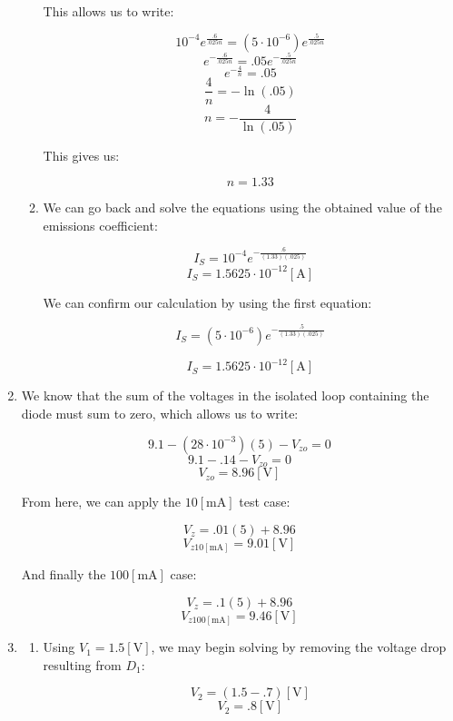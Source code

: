 \begin{enumerate}
\begin{enumerate}
        This allows us to write:

        $$10^{-4}e^{\frac{.6}{.025n}}=(5\cdot10^{-6})e^{\frac{.5}{.025n}}$$
        $$e^{-\frac{.6}{.025n}}=.05e^{-\frac{.5}{.025n}}$$
        $$e^{-\frac{4}{n}}=.05$$
        $$\frac{4}{n}=-\ln(.05)$$
        $$n=-\frac{4}{\ln(.05)}$$

        This gives us:

        $$\boxed{n=1.33}$$

      \item 

        We can go back and solve the equations using the obtained value of the emissions coefficient:

        $$I_S=10^{-4}e^{-\frac{.6}{(1.33)(.025)}}$$
        $$\boxed{I_S=1.5625\cdot10^{-12}[\si{\ampere}]}$$

        We can confirm our calculation by using the first equation:

        $$I_S=(5\cdot10^{-6})e^{-\frac{.5}{(1.33)(.025)}}$$

        $$\boxed{I_S=1.5625\cdot10^{-12}[\si{\ampere}]}$$

    \end{enumerate}

  \item

    We know that the sum of the voltages in the isolated loop containing the diode must sum to zero, which allows us to write:

    $$9.1-(28\cdot10^{-3})(5)-V_{zo}=0$$
    $$9.1-.14-V_{zo}=0$$
    $$\boxed{V_{zo}=8.96[\si{\volt}]}$$

    From here, we can apply the $10[\si{\milli\ampere}]$ test case:

    $$V_z=.01(5)+8.96$$
    $$\boxed{V_{z10[\si{\milli\ampere}]}=9.01[\si{\volt}]}$$

    And finally the $100[\si{\milli\ampere}]$ case:

    $$V_z=.1(5)+8.96$$
    $$\boxed{V_{z100[\si{\milli\ampere}]}=9.46[\si{\volt}]}$$

  \item

    \begin{enumerate}

      \item 

        Using $V_1=1.5[\si{\volt}]$, we may begin solving by removing the voltage drop resulting from $D_1$:

        $$V_2=(1.5-.7)[\si{\volt}]$$
        $$\boxed{V_2=.8[\si{\volt}]}$$


\end{enumerate}
\end{enumerate}
